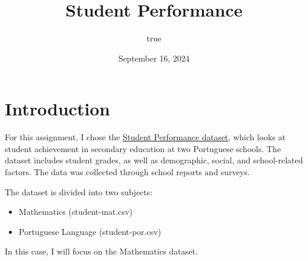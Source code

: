 \documentclass[
  11pt,
]{article}
\title{Student Performance}
\author{true}
\date{September 16, 2024}
\newenvironment{Shaded}{\begin{snugshade}}{\end{snugshade}}
\newcommand{\AttributeTok}[1]{\textcolor[rgb]{0.13,0.29,0.53}{#1}}
\newcommand{\CommentTok}[1]{\textcolor[rgb]{0.56,0.35,0.01}{\textit{#1}}}
\newcommand{\ConstantTok}[1]{\textcolor[rgb]{0.56,0.35,0.01}{#1}}
\newcommand{\FunctionTok}[1]{\textcolor[rgb]{0.13,0.29,0.53}{\textbf{#1}}}
\newcommand{\NormalTok}[1]{#1}
\newcommand{\OtherTok}[1]{\textcolor[rgb]{0.56,0.35,0.01}{#1}}
\newcommand{\SpecialCharTok}[1]{\textcolor[rgb]{0.81,0.36,0.00}{\textbf{#1}}}
\newcommand{\StringTok}[1]{\textcolor[rgb]{0.31,0.60,0.02}{#1}}
\providecommand{\tightlist}{%
  \setlength{\itemsep}{0pt}\setlength{\parskip}{0pt}}
\begin{document}
\maketitle

\section{Introduction}\label{introduction}

For this assignment, I chose the
\href{https://archive.ics.uci.edu/dataset/320/student+performance}{Student
Performance dataset}, which looks at student achievement in secondary
education at two Portuguese schools. The dataset includes student
grades, as well as demographic, social, and school-related factors. The
data was collected through school reports and surveys.

The dataset is divided into two subjects:

\begin{itemize}
\tightlist
\item
  Mathematics (student-mat.csv)
\item
  Portuguese Language (student-por.csv)
\end{itemize}

In this case, I will focus on the Mathematics dataset.

\begin{Shaded}
\end{Shaded}
\end{document}
